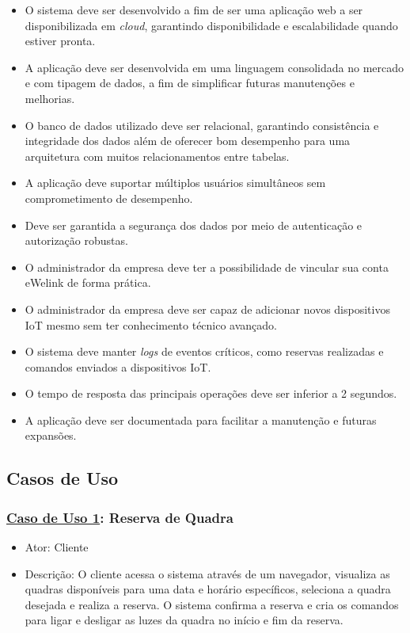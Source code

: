 \begin{itemize}
     \item O sistema deve ser desenvolvido a fim de ser uma aplicação web a ser disponibilizada em \textit{cloud}, garantindo disponibilidade e escalabilidade quando estiver pronta.
     \item A aplicação deve ser desenvolvida em uma linguagem consolidada no mercado e com tipagem de dados, a fim de simplificar futuras manutenções e melhorias.
     \item O banco de dados utilizado deve ser relacional, garantindo consistência e integridade dos dados além de oferecer bom desempenho para uma arquitetura com muitos relacionamentos entre tabelas.
     \item A aplicação deve suportar múltiplos usuários simultâneos sem comprometimento de desempenho.
     \item Deve ser garantida a segurança dos dados por meio de autenticação e autorização robustas.
     \item O administrador da empresa deve ter a possibilidade de vincular sua conta eWelink de forma prática.
     \item O administrador da empresa deve ser capaz de adicionar novos dispositivos IoT mesmo sem ter conhecimento técnico avançado.
     \item O sistema deve manter \textit{logs} de eventos críticos, como reservas realizadas e comandos enviados a dispositivos IoT.
     \item O tempo de resposta das principais operações deve ser inferior a 2 segundos.
     \item A aplicação deve ser documentada para facilitar a manutenção e futuras expansões.
\end{itemize}


\subsection{Casos de Uso}\label{subsec:casos_de_uso}

\subsubsection*{\underline{Caso de Uso 1}: Reserva de Quadra}
\begin{itemize}
     \item Ator: Cliente
     \item Descrição: O cliente acessa o sistema através de um navegador, visualiza as quadras disponíveis para uma data e horário específicos, seleciona a quadra desejada e realiza a reserva. O sistema confirma a reserva e cria os comandos para ligar e desligar as luzes da quadra no início e fim da reserva.
\end{itemize}

